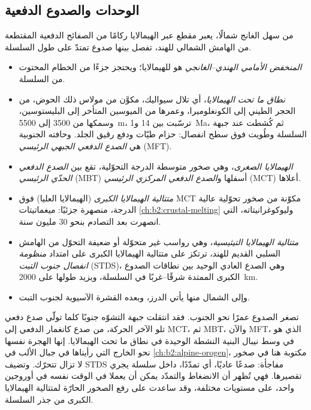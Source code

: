 \subsection{الوحدات والصدوع الدفعية}

من سهل الغانج شمالًا، يعبر مقطع عبر الهيمالايا ركامًا من الصفائح الدفعية
المقتطعة من الهامش الشمالي للهند، تفصل بينها صدوع تمتدّ على طول السلسلة.
\begin{itemize}
\item \emph{المنخفض الأمامي الهندي--الغانجي} هو  للهيمالايا؛ ويحتجز جزءًا من
الحطام المحتوت من السلسلة.
\item \emph{نطاق ما تحت الهيمالايا}، أي تلال سيواليك، مكوَّن من مولاس ذلك الحوض،
من الحجر الطيني إلى الكونغلوميرا، وعمرها من الميوسين المتأخر إلى البليستوسين، وسمكها من 3500 إلى \qty{5500}{m}،
ترسّبت بين 14 و\qty{1}{Ma}، ثم كُشطت عند جبهة السلسلة وطُويت فوق
سطح انفصال: حزام طيّات ودفع رقيق الجلد. وحافته الجنوبية هي \emph{الصدع الدفعي الجبهي
الرئيسي} (MFT).
\item \emph{الهيمالايا الصغرى}، وهي صخور متوسطة الدرجة التحوّلية، تقع بين
\emph{الصدع الدفعي الحدّي الرئيسي} (MBT) أسفلها و\emph{الصدع الدفعي المركزي الرئيسي} (MCT) أعلاها.
\item \emph{متتالية الهيمالايا الكبرى} (الهيمالايا العليا) فوق MCT مكوّنة من
صخور تحوّلية عالية الدرجة، منصهرة جزئيًا: ميغماتيتات
\cref{ch:b2:crustal-melting} وليوكوغرانيتاته، التي انصهرت بعد التصادم بنحو 30 مليون سنة.
\item \emph{متتالية الهيمالايا التيثيسية}، وهي رواسب غير متحوّلة أو ضعيفة التحوّل من
الهامش السلبي القديم للهند، ترتكز على متتالية الهيمالايا الكبرى على امتداد
\emph{منظومة انفصال جنوب التبت} (STDS)، وهي الصدع العادي الوحيد بين نطاقات الصدوع
الكبرى الممتدة شرقًا--غربًا في السلسلة، ويزيد طولها على \qty{2000}{km}.
\item وإلى الشمال منها يأتي الدرز، وبعده القشرة الآسيوية لجنوب التبت.
\end{itemize}

تصغر الصدوع عمرًا نحو الجنوب. فقد انتقلت جبهة التشوّه جنوبًا كلما تولّى صدع دفعي
تلو الآخر الحركة، من صدع كانغمار الدفعي إلى MCT، ثم MBT، والآن MFT، الذي هو في
وسط نيبال البنية النشطة الوحيدة في نطاق ما تحت الهيمالايا. إنها الهجرة نفسها نحو الخارج
التي رأيناها في جبال الألب في \cref{ch:b2:alpine-orogen}، مكتوبة هنا في صخور لا تزال
تتحرّك. وتضيف STDS مفاجأة: صدعًا عاديًا، أي تمدّدًا، داخل سلسلة يجري
تقصيرها. فهي تُظهر أن الانضغاط والتمدّد يمكن أن يعملا في الوقت نفسه في أوروجين واحد،
على مستويات مختلفة، وقد ساعدت على رفع الصخور الحارّة لمتتالية الهيمالايا الكبرى
من جذر السلسلة.

